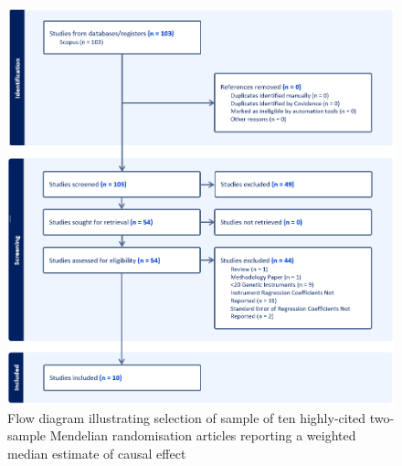 \documentclass[
]{article}
\begin{document}
\begin{figure}
\includegraphics[width=1\linewidth,height=0.7\textheight]{Data/Citations_Search/WME_citation_search_flow_diagram_crop} \caption{Flow diagram illustrating selection of sample of ten highly-cited two-sample Mendelian randomisation articles reporting a weighted median estimate of causal effect}\label{fig:screening-flow}
\end{figure}
\end{document}
